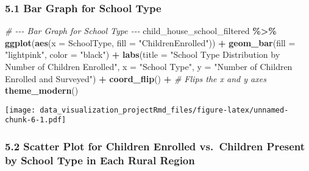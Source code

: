 \documentclass[
]{article}
\newenvironment{Shaded}{\begin{snugshade}}{\end{snugshade}}
\newcommand{\AttributeTok}[1]{\textcolor[rgb]{0.13,0.29,0.53}{#1}}
\newcommand{\CommentTok}[1]{\textcolor[rgb]{0.56,0.35,0.01}{\textit{#1}}}
\newcommand{\FunctionTok}[1]{\textcolor[rgb]{0.13,0.29,0.53}{\textbf{#1}}}
\newcommand{\NormalTok}[1]{#1}
\newcommand{\SpecialCharTok}[1]{\textcolor[rgb]{0.81,0.36,0.00}{\textbf{#1}}}
\newcommand{\StringTok}[1]{\textcolor[rgb]{0.31,0.60,0.02}{#1}}
\begin{document}
\subsubsection{5.1 Bar Graph for School
Type}\label{bar-graph-for-school-type}

\begin{Shaded}
\begin{Highlighting}[]
\CommentTok{\# {-}{-}{-} Bar Graph for School Type {-}{-}{-}}
\NormalTok{child\_house\_school\_filtered }\SpecialCharTok{\%\textgreater{}\%}
  \FunctionTok{ggplot}\NormalTok{(}\FunctionTok{aes}\NormalTok{(}\AttributeTok{x =}\NormalTok{ SchoolType, }\AttributeTok{fill =} \StringTok{"ChildrenEnrolled"}\NormalTok{)) }\SpecialCharTok{+}
  \FunctionTok{geom\_bar}\NormalTok{(}\AttributeTok{fill =} \StringTok{"lightpink"}\NormalTok{, }\AttributeTok{color =} \StringTok{"black"}\NormalTok{) }\SpecialCharTok{+}
  \FunctionTok{labs}\NormalTok{(}\AttributeTok{title =} \StringTok{"School Type Distribution by Number of Children Enrolled"}\NormalTok{,}
       \AttributeTok{x =} \StringTok{"School Type"}\NormalTok{,}
       \AttributeTok{y =} \StringTok{"Number of Children Enrolled and Surveyed"}\NormalTok{) }\SpecialCharTok{+}
  \FunctionTok{coord\_flip}\NormalTok{() }\SpecialCharTok{+}  \CommentTok{\# Flips the x and y axes}
  \FunctionTok{theme\_modern}\NormalTok{()}
\end{Highlighting}
\end{Shaded}

\texttt{[image: data\_visualization\_projectRmd\_files/figure-latex/unnamed-chunk-6-1.pdf]}

\subsubsection{5.2 Scatter Plot for Children Enrolled vs.~Children
Present by School Type in Each Rural
Region}\label{scatter-plot-for-children-enrolled-vs.-children-present-by-school-type-in-each-rural-region}
\end{document}
